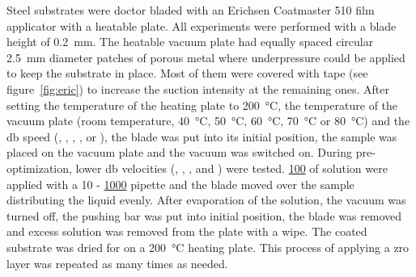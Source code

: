 Steel substrates were doctor bladed with an Erichsen Coatmaster 510 film applicator with a heatable plate.
All experiments were performed with a blade height of \SI{0.2}{\milli\meter}.
%
The heatable vacuum plate had equally spaced circular \SI{2.5}{\milli\meter} diameter patches of porous metal where underpressure could be applied to keep the substrate in place. 
Most of them were covered with tape (see figure~\ref{fig:eric}) to increase the suction intensity at the remaining ones.
After setting the temperature of the heating plate to \SI{200}{\celsius}, the temperature of the vacuum plate 
(room temperature, \SI{40}{\celsius}, \SI{50}{\celsius}, \SI{60}{\celsius}, \SI{70}{\celsius} or \SI{80}{\celsius}) 
and the \gls{db} speed (, , , ,  or ), 
the blade was put into its initial position, the sample was placed on the vacuum plate and the vacuum 
was switched on. 
During pre-optimization, lower \gls{db} velocities (, , 
,  and ) were tested. 
\ul{100} of solution were 
applied with a 10 - \ul{1000} pipette and the blade moved over the sample distributing the liquid evenly. 
After evaporation of the solution, the vacuum was turned off, the pushing bar
was put into initial position, the blade was removed and excess solution was removed from the plate with a wipe. 
The coated substrate was dried for  on a \SI{200}{\celsius} heating plate.
This process of applying a \gls{zro} layer was repeated as many times as needed.
